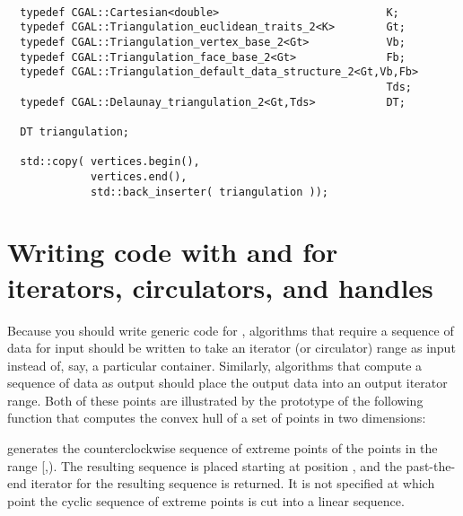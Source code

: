 \begin{verbatim}

  typedef CGAL::Cartesian<double>                          K;
  typedef CGAL::Triangulation_euclidean_traits_2<K>        Gt;
  typedef CGAL::Triangulation_vertex_base_2<Gt>            Vb;
  typedef CGAL::Triangulation_face_base_2<Gt>              Fb;
  typedef CGAL::Triangulation_default_data_structure_2<Gt,Vb,Fb>
                                                           Tds;
  typedef CGAL::Delaunay_triangulation_2<Gt,Tds>           DT;

  DT triangulation;

  std::copy( vertices.begin(),
             vertices.end(),
             std::back_inserter( triangulation ));

\end{verbatim}
\ccIndexMainItemEnd{\stl} 

%

\section{Writing code with and for iterators, circulators, and handles}

Because you should write generic code for \cgal, algorithms that require
a sequence of data for input should be written to take an iterator 
(or circulator) range as input instead of, say, a particular container.
Similarly, algorithms that compute a sequence of data as output should 
place the output data into an output iterator range.  Both of these
points are illustrated by the prototype of the following function that
computes the convex hull of a set of points in two dimensions:

           {generates the counterclockwise sequence of extreme points
            of the points in the range [,).
            The resulting sequence is placed starting at position
            , and the past-the-end iterator for the resulting
            sequence is returned. It is not specified at which point the
            cyclic sequence of extreme points is cut into a linear sequence.}

